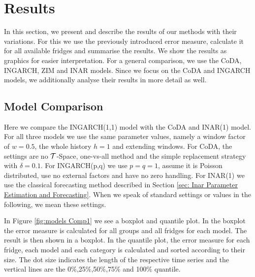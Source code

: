 \section{Results}
\label{sec:Results}

In this section, we present and describe the results of our methods with their variations. For this we use the previously introduced error measure, calculate it for all available fridges and summarise the results. We show the results as graphics for easier interpretation. For a general comparison, we use the CoDA, INGARCH, ZIM and INAR models. Since we focus on the CoDA and INGARCH models, we additionally analyse their results in more detail as well. 

\subsection{Model Comparison}
\label{sec: Model Comparison}

Here we compare the INGARCH(1,1) model with the CoDA and INAR(1) model. For all three models we use the same parameter values, namely a window factor of $w=0.5$, the whole history $h=1$ and extending windows. For CoDA, the settings are no $\mathcal{T}$-Space, one-vs-all method and the simple replacement strategy with $\delta=0.1$. For INGARCH(p,q) we use $p=q=1$, assume it is Poisson distributed, use no external factors and have no zero handling. For INAR(1) we use the classical forecasting method described in Section \ref{sec: Inar Parameter Estimation and Forecasting}. When we speak of standard settings or values in the following, we mean these settings. 

In Figure \ref{fig:models Comp1} we see a boxplot and quantile plot. In the boxplot the error measure is calculated for all groups and all fridges for each model. The result is then shown in a boxplot. In the quantile plot, the error measure for each fridge, each model and each category is calculated and sorted according to their size. The dot size indicates the length of the respective time series and the vertical lines are the 0\%,25\%,50\%,75\% and 100\% quantile.

